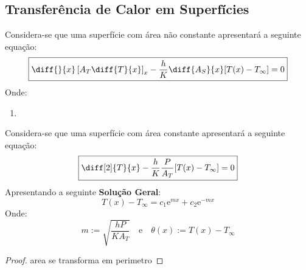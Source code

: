 \documentclass{article}
\begin{document}
        \subsection{Transferência de Calor em Superfícies}
            \begin{definition}
                Considera-se que uma superfície com área não constante apresentará a seguinte equação:
                    \begin{equation}
                        \boxed{
                            \diff{}{x} \left[A_{T}\diff{T}{x}\right]_{\substack{x}} -
                            \frac{h}{K}\diff{A_{S}}{x}[T(x) - T_{\infty}] = 0
                        }
                    \end{equation}
                Onde:
                    \begin{enumerate}
                        \item 
                    \end{enumerate}
            \end{definition}
            \begin{definition}
                Considera-se que uma superfície com área constante apresentará a seguinte equação:
                    \begin{equation}
                        \boxed{
                            \diff[2]{T}{x} -
                            \frac{h}{K}\frac{P}{A_{T}}[T(x) - T_{\infty}] = 0
                        }
                    \end{equation}
                Apresentando a seguinte \textbf{Solução Geral}:
                    \begin{equation}
                        \boxed{
                            T(x) - T_{\infty} = 
                            c_{1}\text{e}^{mx} + c_{2}\text{e}^{-mx}
                        }
                    \end{equation}
                Onde:
                    \begin{equation*}
                        \boxed{m := \sqrt{\frac{h P}{K A_{T}}}}
                        \quad
                        \text{e}
                        \quad
                        \boxed{\theta(x) := T(x) - T_{\infty}}
                    \end{equation*}
            \end{definition}
            \begin{proof}
            area se transforma em perimetro
            \end{proof}
\end{document}
